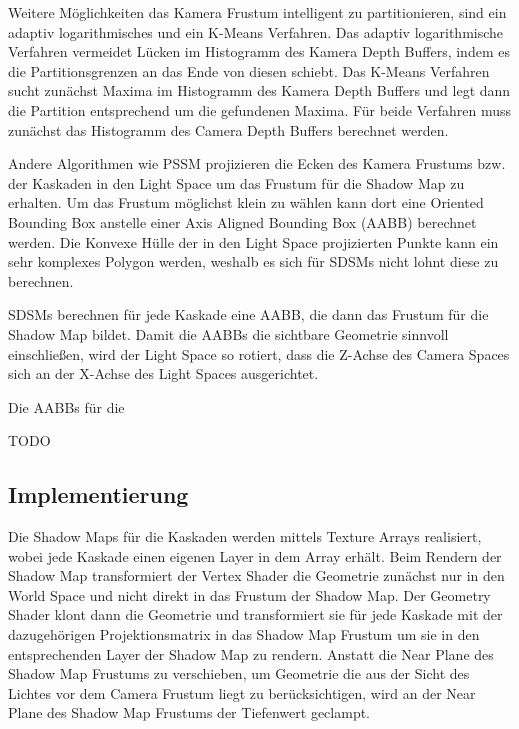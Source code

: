 \documentclass[runningheaders,a4paper]{llncs}
\begin{document}
Weitere Möglichkeiten das Kamera Frustum intelligent zu partitionieren, sind ein adaptiv logarithmisches und ein K-Means Verfahren.
Das adaptiv logarithmische Verfahren vermeidet Lücken im Histogramm des Kamera Depth Buffers, indem es die Partitionsgrenzen an das Ende von diesen schiebt.
Das K-Means Verfahren sucht zunächst Maxima im Histogramm des Kamera Depth Buffers und legt dann die Partition entsprechend um die gefundenen Maxima.
Für beide Verfahren muss zunächst das Histogramm des Camera Depth Buffers berechnet werden.


Andere Algorithmen wie PSSM \cite{pssm} projizieren die Ecken des Kamera Frustums bzw. der Kaskaden in den Light Space um das Frustum für die Shadow Map zu erhalten.
Um das Frustum möglichst klein zu wählen kann dort eine Oriented Bounding Box anstelle einer Axis Aligned Bounding Box (AABB) berechnet werden.
Die Konvexe Hülle der in den Light Space projizierten Punkte kann ein sehr komplexes Polygon werden, weshalb es sich für SDSMs nicht lohnt diese zu berechnen.

SDSMs berechnen für jede Kaskade eine AABB, die dann das Frustum für die Shadow Map bildet.
Damit die AABBs die sichtbare Geometrie sinnvoll einschließen, wird der Light Space so rotiert, dass die Z-Achse des Camera Spaces sich an der X-Achse des Light Spaces ausgerichtet.

Die AABBs für die 

TODO


\subsection{Implementierung}

Die Shadow Maps für die Kaskaden werden mittels Texture Arrays realisiert, wobei jede Kaskade einen eigenen Layer in dem Array erhält.
Beim Rendern der Shadow Map transformiert der Vertex Shader die Geometrie zunächst nur in den World Space und nicht direkt in das Frustum der Shadow Map.
Der Geometry Shader klont dann die Geometrie und transformiert sie für jede Kaskade mit der dazugehörigen Projektionsmatrix in das Shadow Map Frustum um sie in den entsprechenden Layer der Shadow Map zu rendern.
Anstatt die Near Plane des Shadow Map Frustums zu verschieben, um Geometrie die aus der Sicht des Lichtes vor dem Camera Frustum liegt zu berücksichtigen, wird an der Near Plane des Shadow Map Frustums der Tiefenwert geclampt.
\end{document}
